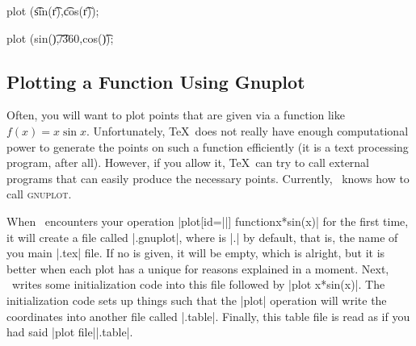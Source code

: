 \begin{codeexample}[]
\end{codeexample}

\begin{codeexample}[]
\tikz \draw[scale=0.5,domain=-3.141:3.141,smooth,variable=\t]
  plot ({\t*sin(\t r)},{\t*cos(\t r)});
\end{codeexample}

\begin{codeexample}[]
\tikz \draw[domain=0:360,smooth,variable=\t]
  plot ({sin(\t)},\t/360,{cos(\t)});
\end{codeexample}


\subsection{Plotting a Function Using Gnuplot}
\label{section-tikz-gnuplot}

Often, you will want to plot points that are given via a function like
$f(x) = x \sin x$. Unfortunately, \TeX\ does not really have enough
computational power to generate the points on such a function
efficiently (it is a text processing program, after all). However,
if you allow it, \TeX\ can try to call external programs that can
easily produce the necessary points. Currently, \tikzname\ knows how to
call \textsc{gnuplot}.

When \tikzname\ encounters your operation
|plot[id=||] function{x*sin(x)}| for 
the first time, it will create a file called
|.gnuplot|, where  is |\jobname.| by
default, that is, the name of you main |.tex| file. If no  is
given, it will be empty, which is alright, but it is better when each
plot has a unique  for reasons explained in a moment. Next,
\tikzname\ writes some initialization code into this file followed by
|plot x*sin(x)|. The initialization code sets up things 
such that the |plot| operation will write the coordinates into another
file called |.table|. Finally, this table file
is read as if you had said |plot file{||.table}|. 


